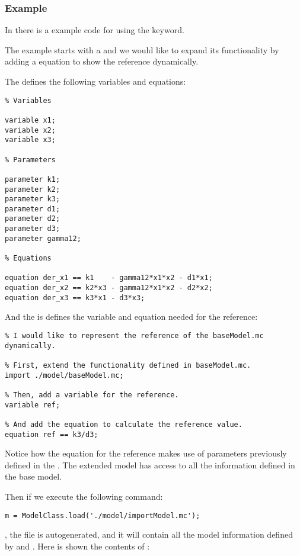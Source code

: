 \documentclass[11pt]{article}
\begin{document}
\subsubsection{Example}

In  there is a example code for using the  keyword.

The example starts with a  and we would like to expand its functionality by adding a equation to show the reference dynamically.

The  defines the following variables and equations:

\begin{lstlisting}
% Variables

variable x1;
variable x2;
variable x3;

% Parameters

parameter k1;
parameter k2;
parameter k3;
parameter d1;
parameter d2;
parameter d3;
parameter gamma12;

% Equations

equation der_x1 == k1    - gamma12*x1*x2 - d1*x1;
equation der_x2 == k2*x3 - gamma12*x1*x2 - d2*x2;
equation der_x3 == k3*x1 - d3*x3;
\end{lstlisting}

And the  is defines the variable and equation needed for the reference:

\begin{lstlisting}
% I would like to represent the reference of the baseModel.mc dynamically.

% First, extend the functionality defined in baseModel.mc.
import ./model/baseModel.mc;

% Then, add a variable for the reference.
variable ref;

% And add the equation to calculate the reference value.
equation ref == k3/d3;
\end{lstlisting}

Notice how the equation for the reference  makes use of parameters previously defined in the . The extended model has access to all the information defined in the base model.

Then if we execute the following command:

\begin{lstlisting}
m = ModelClass.load('./model/importModel.mc');
\end{lstlisting}

, the file  is autogenerated, and it will contain all the model information defined by  and . Here is shown the contents of :
\end{document}
